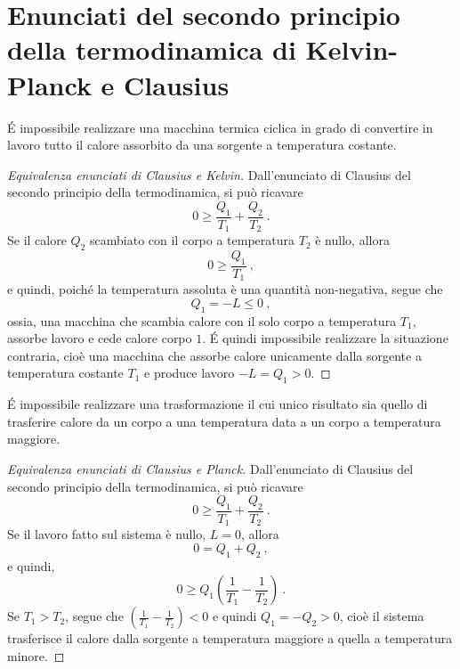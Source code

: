 \section{Enunciati del secondo principio della termodinamica di Kelvin-Planck e Clausius}

\begin{definition} \'E impossibile realizzare una macchina termica ciclica in grado di convertire in lavoro tutto il calore assorbito da una sorgente a temperatura costante.
\end{definition}
\begin{proof}[Equivalenza enunciati di Clausius e Kelvin] Dall'enunciato di Clausius del secondo principio della termodinamica, si può ricavare
\begin{equation}
    0 \ge \dfrac{Q_1}{T_1} + \dfrac{Q_2}{T_2} \ .
\end{equation}
Se il calore $Q_2$ scambiato con il corpo a temperatura $T_2$ è nullo, allora
\begin{equation}
     0 \ge \dfrac{Q_1}{T_1} \ ,
\end{equation}
e quindi, poiché la temperatura assoluta è una quantità non-negativa, segue che
\begin{equation}
    Q_1 = -L \le 0 \ ,
\end{equation}
ossia, una macchina che scambia calore con il solo corpo a temperatura $T_1$, assorbe lavoro e cede calore corpo $1$. \'E quindi impossibile realizzare la situazione contraria, cioè una macchina che assorbe calore unicamente dalla sorgente a temperatura costante $T_1$ e produce lavoro $-L = Q_1 > 0$.
\end{proof}

\begin{definition} \'E impossibile realizzare una trasformazione il cui unico risultato sia quello di trasferire calore da un corpo a una temperatura data a un corpo a temperatura maggiore.
\end{definition}
\begin{proof}[Equivalenza enunciati di Clausius e Planck] Dall'enunciato di Clausius del secondo principio della termodinamica, si può ricavare
\begin{equation}
    0 \ge \dfrac{Q_1}{T_1} + \dfrac{Q_2}{T_2} \ .
\end{equation}
Se il lavoro fatto sul sistema è nullo, $L = 0$, allora
\begin{equation}
    0 = Q_1 + Q_2 \ ,
\end{equation}
e quindi,
\begin{equation}
    0 \ge Q_1 \left( \dfrac{1}{T_1} - \dfrac{1}{T_2} \right) \ .
\end{equation}
    Se $T_1 > T_2$, segue che $\left(\frac{1}{T_1} - \frac{1}{T_2} \right) < 0$ e quindi $Q_1 = - Q_2 > 0$, cioè il sistema trasferisce il calore dalla sorgente a temperatura maggiore a quella a temperatura minore.

\end{proof}

